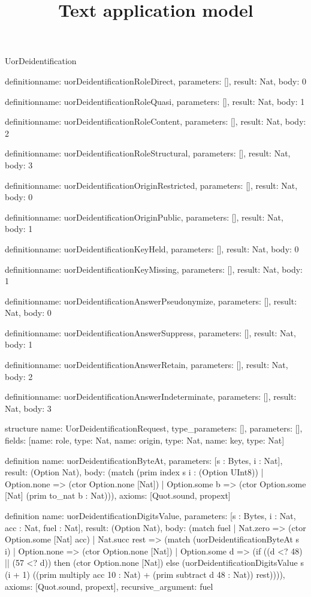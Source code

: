 \begin{lexlean}{UorDeidentification}
\title{Text application model}
\begin{semanticmodule}
definition{name: uorDeidentificationRoleDirect, parameters: [], result: Nat, body: 0}

definition{name: uorDeidentificationRoleQuasi, parameters: [], result: Nat, body: 1}

definition{name: uorDeidentificationRoleContent, parameters: [], result: Nat, body: 2}

definition{name: uorDeidentificationRoleStructural, parameters: [], result: Nat, body: 3}

definition{name: uorDeidentificationOriginRestricted, parameters: [], result: Nat, body: 0}

definition{name: uorDeidentificationOriginPublic, parameters: [], result: Nat, body: 1}

definition{name: uorDeidentificationKeyHeld, parameters: [], result: Nat, body: 0}

definition{name: uorDeidentificationKeyMissing, parameters: [], result: Nat, body: 1}

definition{name: uorDeidentificationAnswerPseudonymize, parameters: [], result: Nat, body: 0}

definition{name: uorDeidentificationAnswerSuppress, parameters: [], result: Nat, body: 1}

definition{name: uorDeidentificationAnswerRetain, parameters: [], result: Nat, body: 2}

definition{name: uorDeidentificationAnswerIndeterminate, parameters: [], result: Nat, body: 3}

structure{
  name: UorDeidentificationRequest,
  type_parameters: [],
  parameters: [],
  fields: [{name: role, type: Nat}, {name: origin, type: Nat}, {name: key, type: Nat}]
}

definition{
  name: uorDeidentificationByteAt,
  parameters: [s : Bytes, i : Nat],
  result: (Option Nat),
  body: (match (prim index s i : (Option UInt8))
    | Option.none => (ctor Option.none [Nat])
    | Option.some b => (ctor Option.some [Nat] (prim to_nat b : Nat))),
  axioms: [Quot.sound, propext]
}

definition{
  name: uorDeidentificationDigitsValue,
  parameters: [s : Bytes, i : Nat, acc : Nat, fuel : Nat],
  result: (Option Nat),
  body: (match fuel
    | Nat.zero => (ctor Option.some [Nat] acc)
    | Nat.succ rest => (match (uorDeidentificationByteAt s i)
      | Option.none => (ctor Option.none [Nat])
      | Option.some d => (if ((d <? 48) || (57 <? d)) then (ctor Option.none [Nat]) else (uorDeidentificationDigitsValue s (i + 1) ((prim multiply acc 10 : Nat) + (prim subtract d 48 : Nat)) rest)))),
  axioms: [Quot.sound, propext],
  recursive_argument: fuel
}


\end{semanticmodule}
\end{lexlean}
